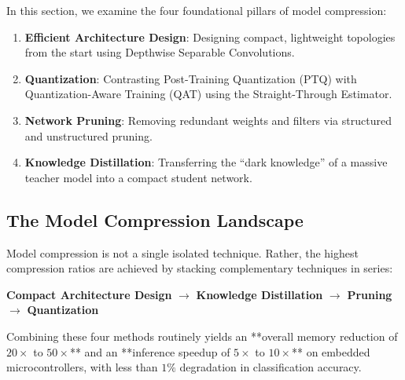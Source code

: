 In this section, we examine the four foundational pillars of model compression:
\begin{enumerate}
    \item \textbf{Efficient Architecture Design}: Designing compact, lightweight topologies from the start using Depthwise Separable Convolutions.
    \item \textbf{Quantization}: Contrasting Post-Training Quantization (PTQ) with Quantization-Aware Training (QAT) using the Straight-Through Estimator.
    \item \textbf{Network Pruning}: Removing redundant weights and filters via structured and unstructured pruning.
    \item \textbf{Knowledge Distillation}: Transferring the ``dark knowledge'' of a massive teacher model into a compact student network.
\end{enumerate}

\subsection{The Model Compression Landscape}\label{subsec:compression_landscape}

\begin{keyidea}
Model compression is not a single isolated technique. Rather, the highest compression ratios are achieved by stacking complementary techniques in series:
\begin{center}
\textbf{Compact Architecture Design} $\longrightarrow$ \textbf{Knowledge Distillation} $\longrightarrow$ \textbf{Pruning} $\longrightarrow$ \textbf{Quantization}
\end{center}
Combining these four methods routinely yields an **overall memory reduction of $20\times$ to $50\times$** and an **inference speedup of $5\times$ to $10\times$** on embedded microcontrollers, with less than $1\%$ degradation in classification accuracy.
\end{keyidea}


